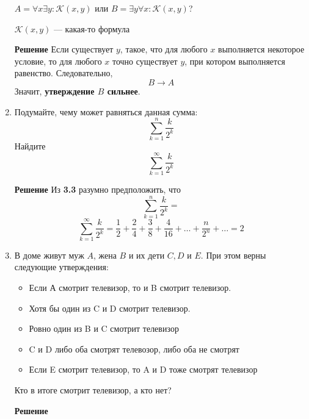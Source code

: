 \documentclass[12pt]{article}
\begin{document}
\begin{enumerate}[label={\textbf{\arabic{section}.\arabic*}}]
		$A = \forall x \exists y: \mathcal{K}(x,y)$ или $B = \exists y\forall x: \mathcal{K}(x,y)$?
		
		$\mathcal{K}(x,y)$ — какая-то формула
		
		\textbf{Решение}
		Если существует $y$, такое, что для любого $x$ выполняется некоторое условие, то для любого $x$ точно существует $y$, при котором выполняется равенство. Следовательно,
		$$
		B \rightarrow A
		$$
		Значит, \textbf{утверждение $B$ сильнее}.
		\item Подумайте, чему может равняться данная сумма:
		$$
		\sum_{k=1}^n \frac{k}{2^k}
		$$
		Найдите
		$$
		\sum_{k=1}^\infty \frac{k}{2^k}
		$$
		
		\textbf{Решение}
		Из \textbf{3.3} разумно предположить, что
		$$
		\sum_{k=1}^n \frac{k}{2^k} = 
		$$
		$$
		\sum_{k=1}^{\infty} \frac{k}{2^k} = \frac{1}{2} + \frac{2}{4} + \frac{3}{8} + \frac{4}{16} + \dots + \frac{n}{2^n} + \dots = 2
		$$
		
		\item В доме живут муж $A$, жена $B$ и их дети $C,D$ и $E$. При этом верны следующие утверждения:
		\begin{itemize}
			\item Если А смотрит телевизор, то и B смотрит телевизор.
			
			\item Хотя бы один из C и D смотрит телевизор.
			
			\item Ровно один из B и C смотрит телевизор
			
			\item C и D либо оба смотрят телевозор, либо оба не смотрят
			
			\item Если E смотрит телевизор, то A и D тоже смотрят телевизор
		\end{itemize}		
		Кто в итоге смотрит телевизор, а кто нет?
		
		\textbf{Решение}
		

\end{enumerate}
\end{document}
